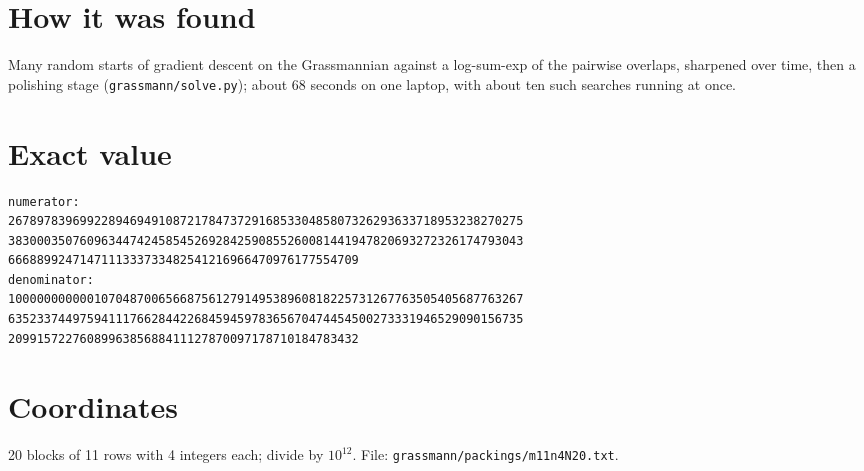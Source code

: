 \documentclass[11pt,a4paper]{article}
\begin{document}
\section{How it was found}
Many random starts of gradient descent on the Grassmannian against a log-sum-exp of the pairwise overlaps, sharpened over time, then a polishing stage (\texttt{grassmann/solve.py}); about 68 seconds on one laptop, with about ten such searches running at once.


\appendix
\section{Exact value}
{\small
\begin{verbatim}
numerator:
267897839699228946949108721784737291685330485807326293633718953238270275
383000350760963447424585452692842590855260081441947820693272326174793043
6668899247147111333733482541216966470976177554709
denominator:
100000000000107048700656687561279149538960818225731267763505405687763267
635233744975941117662844226845945978365670474454500273331946529090156735
2099157227608996385688411127870097178710184783432
\end{verbatim}}

\section{Coordinates}
20 blocks of 11 rows with 4 integers each; divide by $10^{12}$. File: \texttt{grassmann/packings/m11n4N20.txt}.
{\tiny
\begin{multicols}{3}
\end{multicols}}
\end{document}
